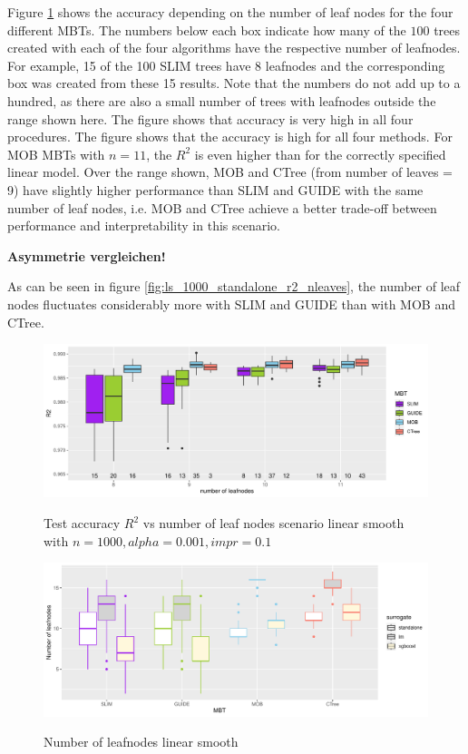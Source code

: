 Figure \ref{fig:ls_1000_standalone_r2_train} shows the accuracy depending on the number of leaf nodes for the four different MBTs.
The numbers below each box indicate how many of the $100$ trees created with each of the four algorithms have the respective number of leafnodes. For example, 15 of the 100 SLIM trees have 8 leafnodes and the corresponding box was created from these 15 results. Note that the numbers do not add up to a hundred, as there are also a small number of trees with leafnodes outside the range shown here. The figure shows that accuracy is very high in all four procedures. The figure shows that the accuracy is high for all four methods. For MOB MBTs with $n=11$, the $R^2$ is even higher than for the correctly specified linear model.  Over the range shown, MOB and CTree (from number of leaves = 9) have slightly higher performance than SLIM and GUIDE with the same number of leaf nodes, i.e. MOB and CTree achieve a better trade-off between performance and interpretability in this scenario.

\textbf{Asymmetrie vergleichen!}

As can be seen in figure \ref{fig:ls_1000_standalone_r2_nleaves}, the number of leaf nodes fluctuates considerably more with SLIM and GUIDE than with MOB and CTree. 



\begin{figure} 
\caption{Test accuracy $R^2$ vs number of leaf nodes scenario linear smooth with $n=1000, alpha = 0.001, impr = 0.1$}
    \includegraphics[width=16cm]{Figures/simulations/batchtools/basic_scenarios/linear_smooth/ls_1000_standalone_r2_test.pdf}
    \label{fig:ls_1000_standalone_r2_train}
\end{figure} 





\begin{figure} 
\caption{Number of leafnodes linear smooth}
    \includegraphics[width=16cm]{Figures/simulations/batchtools/basic_scenarios/linear_smooth/ls_1000_int.pdf}
    \label{fig:ls_1000_int}
\end{figure} 

